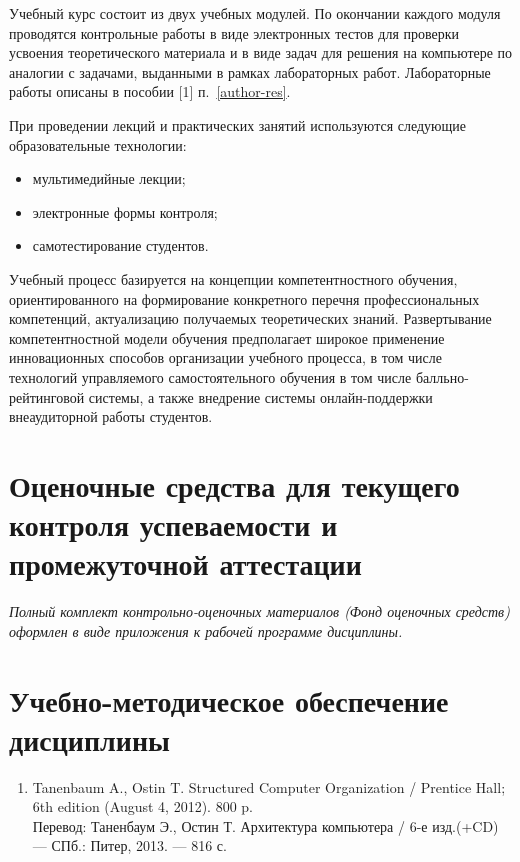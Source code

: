 Учебный курс состоит из двух учебных модулей. По окончании каждого модуля проводятся контрольные работы в виде электронных тестов для проверки усвоения теоретического материала и в виде задач для решения на компьютере по аналогии с задачами, выданными в рамках лабораторных работ. Лабораторные работы описаны в пособии [1] п.~\ref{author-res}.

При проведении лекций и практических занятий используются следующие образовательные технологии:
\begin{itemize}
	\item мультимедийные лекции;
	\item электронные формы контроля;
	\item самотестирование студентов.
\end{itemize}

Учебный процесс базируется на концепции компетентностного обучения, ориентированного на формирование конкретного перечня профессиональных компетенций, актуализацию получаемых теоретических знаний. Развертывание компетентностной модели обучения предполагает широкое применение инновационных способов организации учебного процесса, в том числе технологий управляемого самостоятельного обучения в том числе балльно-рейтинговой системы, а также внедрение системы онлайн-поддержки внеаудиторной работы студентов.

\section{Оценочные средства для текущего контроля успеваемости и промежуточной аттестации}

\emph{Полный комплект контрольно-оценочных материалов (Фонд оценочных средств) оформлен в виде приложения к рабочей программе дисциплины.}

\section{Учебно-методическое обеспечение дисциплины}

	\label{main-lit}

\begin{enumerate}
	\item Tanenbaum A., Ostin T. Structured Computer Organization / Prentice Hall; 6th edition (August 4, 2012). 800 p.\\
	Перевод: Таненбаум Э., Остин Т. Архитектура компьютера / 6-е изд.(+CD) — СПб.: Питер, 2013. — 816 с.
\end{enumerate}

